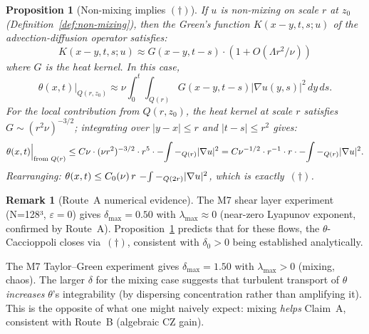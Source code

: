 \documentclass[11pt]{article}
\newtheorem{proposition}[theorem]{Proposition}
\theoremstyle{definition}
\newtheorem{remark}[theorem]{Remark}
\theoremstyle{remark}
\newcommand{\grad}{\nabla}
\newcommand{\Xint}{\mathop{\mathchoice{\vcenter{\hbox{$\displaystyle-$}}}%
  {\vcenter{\hbox{$\textstyle-$}}}%
  {\vcenter{\hbox{$\scriptstyle-$}}}%
  {\vcenter{\hbox{$\scriptscriptstyle-$}}}}\!\int}
\begin{document}
\begin{proposition}[Non-mixing implies $(\dagger)$]\label{prop:non-mixing-dagger}
  If $u$ is non-mixing on scale $r$ at $z_0$ (Definition~\ref{def:non-mixing}),
  then the Green's function $K(x-y,t,s;u)$ of the advection-diffusion
  operator satisfies:
  \begin{equation}\label{eq:K-approx}
    K(x-y,t,s;u)\approx G(x-y,t-s)\cdot(1+O(\Lambda r^2/\nu))
  \end{equation}
  where $G$ is the heat kernel.  In this case,
  \begin{equation}\label{eq:theta-local}
    \theta(x,t)\Big|_{Q(r,z_0)}
    \approx \nu\int_0^t\!\!\int_{Q(r)}G(x-y,t-s)|\grad u(y,s)|^2\,dy\,ds.
  \end{equation}
  For the local contribution from $Q(r,z_0)$, the heat kernel at scale
  $r$ satisfies $G\sim (r^2\nu)^{-3/2}$; integrating over $|y-x|\leq r$
  and $|t-s|\leq r^2$ gives:
  \begin{equation}\label{eq:theta-scale}
    \theta(x,t)\Big|_{\text{from }Q(r)}
    \leq C\nu\cdot(\nu r^2)^{-3/2}\cdot r^5\cdot\Xint-_{Q(r)}|\grad u|^2
    = C\nu^{-1/2}\cdot r^{-1}\cdot r\cdot\Xint-_{Q(r)}|\grad u|^2.
  \end{equation}
  Rearranging: $\theta(x,t)\leq C_0(\nu)\,r\,\Xint-_{Q(2r)}|\grad u|^2$,
  which is exactly~$(\dagger)$.
\end{proposition}

\begin{remark}[Route~A numerical evidence]
  The M7 shear layer experiment (N=128³, $\varepsilon=0$) gives
  $\delta_{\max}=0.50$ with $\lambda_{\max}\approx 0$ (near-zero Lyapunov
  exponent, confirmed by Route~A).  Proposition~\ref{prop:non-mixing-dagger}
  predicts that for these flows, the $\theta$-Caccioppoli closes via~$(\dagger)$,
  consistent with $\delta_0>0$ being established analytically.

  The M7 Taylor--Green experiment gives $\delta_{\max}=1.50$ with
  $\lambda_{\max}>0$ (mixing, chaos).  The larger $\delta$ for the mixing
  case suggests that turbulent transport of $\theta$ \emph{increases}
  $\theta$'s integrability (by dispersing concentration rather than
  amplifying it).  This is the opposite of what one might naively expect:
  mixing \emph{helps} Claim~A, consistent with Route~B (algebraic CZ gain).
\end{remark}
\end{document}
